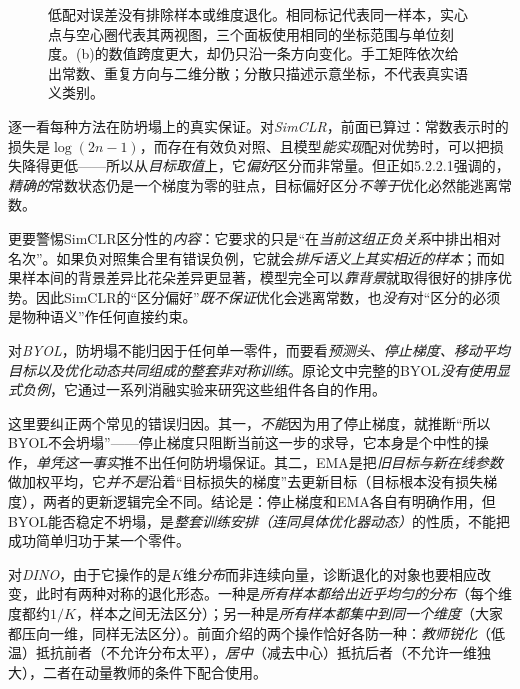 \begin{figure}[!t]
  \centering
  
  \caption{低配对误差没有排除样本或维度退化。相同标记代表同一样本，实心点与空心圈代表其两视图，三个面板使用相同的坐标范围与单位刻度。(b)的数值跨度更大，却仍只沿一条方向变化。手工矩阵依次给出常数、重复方向与二维分散；分散只描述示意坐标，不代表真实语义类别。}
  \label{fig:data-derived-knowledge-representation-degeneration}
\end{figure}

逐一看每种方法在防坍塌上的真实保证。对\emph{SimCLR}，前面已算过：常数表示时的损失是$\log(2n-1)$，而存在有效负对照、且模型\emph{能实现}配对优势时，可以把损失降得更低——所以从\emph{目标取值}上，它\emph{偏好}区分而非常量。但正如5.2.2.1强调的，\emph{精确的}常数状态仍是一个梯度为零的驻点，目标偏好区分\emph{不等于}优化必然能逃离常数。

更要警惕SimCLR区分性的\emph{内容}：它要求的只是“在\emph{当前这组正负关系}中排出相对名次”。如果负对照集合里有错误负例，它就会\emph{排斥语义上其实相近的样本}；而如果样本间的背景差异比花朵差异更显著，模型完全可以\emph{靠背景}就取得很好的排序优势。因此SimCLR的“区分偏好”\emph{既不保证}优化会逃离常数，也\emph{没有}对“区分的必须是物种语义”作任何直接约束。

对\emph{BYOL}，防坍塌不能归因于任何单一零件，而要看\emph{预测头、停止梯度、移动平均目标以及优化动态共同组成的整套非对称训练}。原论文中完整的BYOL\emph{没有使用显式负例}，它通过一系列消融实验来研究这些组件各自的作用。

这里要纠正两个常见的错误归因。其一，\emph{不能}因为用了停止梯度，就推断“所以BYOL不会坍塌”——停止梯度只阻断当前这一步的求导，它本身是个中性的操作，\emph{单凭这一事实}推不出任何防坍塌保证。其二，EMA是把\emph{旧目标与新在线参数}做加权平均，它\emph{并不是}沿着“目标损失的梯度”去更新目标（目标根本没有损失梯度），两者的更新逻辑完全不同。结论是：停止梯度和EMA各自有明确作用，但BYOL能否稳定不坍塌，是\emph{整套训练安排（连同具体优化器动态）}的性质，不能把成功简单归功于某一个零件。

对\emph{DINO}，由于它操作的是$K$维\emph{分布}而非连续向量，诊断退化的对象也要相应改变，此时有两种对称的退化形态。一种是\emph{所有样本都给出近乎均匀的分布}（每个维度都约$1/K$，样本之间无法区分）；另一种是\emph{所有样本都集中到同一个维度}（大家都压向一维，同样无法区分）。前面介绍的两个操作恰好各防一种：\emph{教师锐化}（低温）抵抗前者（不允许分布太平），\emph{居中}（减去中心）抵抗后者（不允许一维独大），二者在动量教师的条件下配合使用。

